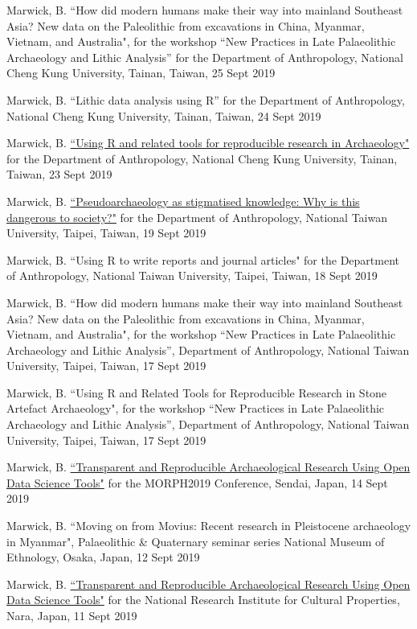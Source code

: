 \ind Marwick, B.  ``How did modern humans make their way into mainland Southeast Asia? New data on the Paleolithic from excavations in China, Myanmar, Vietnam, and Australia", for the workshop “New Practices in Late Palaeolithic Archaeology and Lithic Analysis” for the Department of Anthropology, National Cheng Kung University, Tainan, Taiwan, 25 Sept 2019 

\ind Marwick, B. ``Lithic data analysis using R” for the Department of Anthropology, National Cheng Kung University, Tainan, Taiwan, 24 Sept 2019 

\ind Marwick, B. \href{https://osf.io/e3x7u/}{``Using R and related tools for reproducible research in Archaeology"} for the Department of Anthropology, National Cheng Kung University, Tainan, Taiwan, 23 Sept 2019 

\ind Marwick, B. \href{https://osf.io/ktrns/}{``Pseudoarchaeology as stigmatised knowledge: Why is this dangerous to society?"} for the Department of Anthropology, National Taiwan University, Taipei, Taiwan, 19 Sept 2019 

\ind Marwick, B. ``Using R to write reports and journal articles" for the Department of Anthropology, National Taiwan University, Taipei, Taiwan, 18 Sept 2019

\ind Marwick, B. ``How did modern humans make their way into mainland Southeast Asia? New data on the Paleolithic from excavations in China, Myanmar, Vietnam, and Australia", for the workshop “New Practices in Late Palaeolithic Archaeology and Lithic Analysis”, Department of Anthropology, National Taiwan University, Taipei, Taiwan, 17 Sept 2019

\ind Marwick, B. ``Using R and Related Tools for Reproducible Research in Stone Artefact Archaeology", for the workshop “New Practices in Late Palaeolithic Archaeology and Lithic Analysis”, Department of Anthropology, National Taiwan University, Taipei, Taiwan, 17 Sept 2019

\ind Marwick, B. \href{https://benmarwick.github.io/2019-09-14-morph2019/}{``Transparent and Reproducible Archaeological Research Using Open Data Science Tools"} for the MORPH2019 Conference, Sendai, Japan, 14 Sept 2019 

\ind Marwick, B.  ``Moving on from Movius: Recent research in Pleistocene archaeology in Myanmar", Palaeolithic \& Quaternary seminar series National Museum of Ethnology, Osaka, Japan, 12 Sept 2019

\ind Marwick, B. \href{https://benmarwick.github.io/2019-09-10-nara/}{``Transparent and Reproducible Archaeological Research Using Open Data Science Tools"} for the National Research Institute for Cultural Properties, Nara, Japan, 11 Sept 2019 

